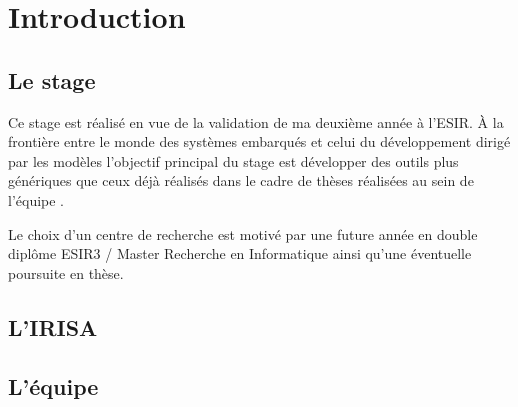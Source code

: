 \section*{Introduction} %

\subsection{Le stage}
Ce stage est réalisé en vue de la validation de ma deuxième année à l'ESIR. À la frontière entre le monde des systèmes embarqués et celui du développement dirigé par les modèles l'objectif principal du stage est développer des outils plus génériques que ceux déjà réalisés dans le cadre de thèses réalisées au sein de l'équipe \diver.

Le choix d'un centre de recherche est motivé par une future année en double diplôme ESIR3 / Master Recherche en Informatique ainsi qu'une éventuelle poursuite en thèse.

\subsection{L'IRISA}

\subsection{L'équipe }

